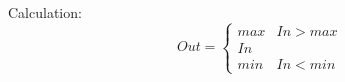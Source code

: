 Calculation:
\begin{equation*}
	Out = \begin{cases}max & In > max \\ In \\min & In < min\end{cases}
\end{equation*}